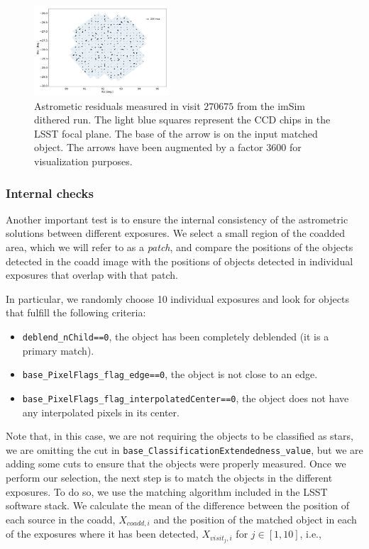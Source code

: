 \documentclass[twocolumn]{aastex62}
\begin{document}
\begin{figure}
  \centering
  \includegraphics[width=0.45\textwidth]{astrometry_imsim_dithered_interp}
  \caption{Astrometic residuals measured in visit $270675$ from the imSim dithered run. The light blue squares represent the CCD chips in
  the LSST focal plane. The base of the arrow is on the input matched object. The arrows have been augmented by a factor 3600 for visualization purposes.}
  \label{fig:astrometry_c}
\end{figure}


\subsubsection{Internal checks}
\label{sec:internal_astrometry}

Another important test is to ensure the internal consistency of the astrometric solutions between different exposures. We select
a small region of the coadded area, which we will refer to as a \textit{patch}, and compare the positions of the objects detected in the coadd
image with the positions of objects detected in individual exposures that overlap with that patch.

In particular, we randomly choose 10 individual exposures and look for objects that fulfill the following criteria:
\begin{itemize}
  \item \texttt{deblend\_nChild==0}, the object has been completely deblended (it is a primary match).
  \item \texttt{base\_PixelFlags\_flag\_edge==0}, the object is not close to an edge.
  \item \texttt{base\_PixelFlags\_flag\_interpolatedCenter==0}, the object does not have any interpolated pixels in its center.
\end{itemize}

Note that, in this case, we are not requiring the objects to be classified as stars, we are omitting the cut in
\texttt{base\_ClassificationExtendedness\_value}, but we are adding some cuts to ensure that the objects were properly measured. Once
we perform our selection, the next step is to match the objects in the different exposures. To do so, we use the matching algorithm
included in the LSST software stack. We calculate the mean of the difference between the position of each source
in the coadd, $X_{coadd,i}$ and the position of the matched object in each of the exposures where it has been detected, $X_{visit_{j},i}$
for $j \in [1,10]$, i.e.,
\end{document}
